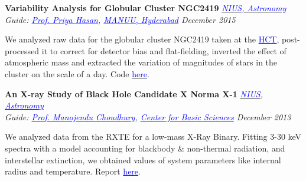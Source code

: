 \documentclass[margin,line]{res}
\newenvironment{list1}{
  \begin{list}{\ding{113}}{%
      \setlength{\itemsep}{0in}
      \setlength{\parsep}{0in} \setlength{\parskip}{0in}
      \setlength{\topsep}{0in} \setlength{\partopsep}{0in} 
      \setlength{\leftmargin}{0.17in}}}{\end{list}}
\begin{document}
\begin{resume}
\vspace*{-0.1in}

{\bf Variability Analysis for Globular Cluster NGC2419} \hfill \textit{\href{http://nius.hbcse.tifr.res.in/}{\textcolor{blue} {NIUS, Astronomy}}} \\
{\em Guide: \href{http://http://manuu.ac.in/deptphysc_faclty.php/}{\textcolor{blue}{Prof. Priya Hasan}}, \href{http://manuu.ac.in/}{\textcolor{blue} {MANUU, Hyderabad}} \hfill December 2015} \\
\vspace*{-.15in}
\begin{list1}
\item[] We analyzed raw data for the globular cluster NGC2419 taken at the \href{http://www.iiap.res.in/iao/cycle.html}{\textcolor{blue} {HCT}}, post-processed it to correct for detector bias and flat-fielding, inverted the effect of atmospheric mass and extracted the variation of magnitudes of stars in the cluster on the scale of a day. Code \href{https://github.com/alankarkotwal/ngc2419-variables}{\textcolor{blue} {here}}.
\end{list1}

\vspace*{-0.1in}

{\bf An X-ray Study of Black Hole Candidate X Norma X-1} \hfill \textit{\href{http://nius.hbcse.tifr.res.in/}{\textcolor{blue} {NIUS, Astronomy}}} \\
{\em Guide: \href{http://cbs.ac.in/people/visiting-scientists/manojendu-choudhury}{\textcolor{blue}{Prof. Manojendu Choudhury}}, \href{http://cbs.ac.in/}{\textcolor{blue} {Center for Basic Sciences}} \hfill December 2013} \\
\vspace*{-.15in}
\begin{list1}
\item[] We analyzed data from the RXTE for a low-mass X-Ray Binary. Fitting 3-30 keV spectra with a model accounting for blackbody \& non-thermal radiation, and interstellar extinction, we obtained values of system parameters like internal radius and temperature. Report \href{https://alankarkotwal.github.io/4U_1630-47_Report.pdf}{\textcolor{blue} {here}}.
\end{list1}

\vspace*{-0.1in}


\end{resume}
\end{document}
